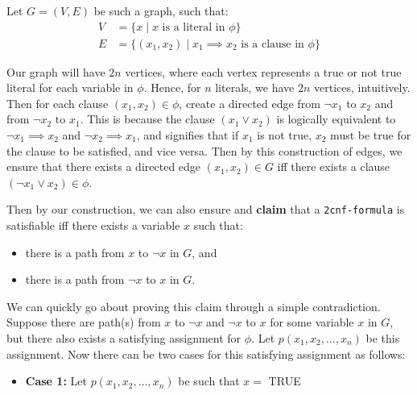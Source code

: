 \documentclass[addpoints,a4paper]{exam}
\begin{document}
\begin{questions}
\begin{solution}
    Let $ G = (V, E) $ be such a graph, such that: \vspace*{-2mm} \begin{align*}
      V & = \{ x \mid x \text{ is a literal in } \phi \}                        \\
      E & = \{ (x_1, x_2) \mid x_1 \implies x_2 \text{ is a clause in } \phi \}
    \end{align*} \vspace*{-7mm}

    Our graph will have $ 2n $ vertices, where each vertex represents a true or not true literal for each variable in $\phi$. Hence, for $n$ literals, we have $2n$ vertices, intuitively. Then for each clause $ (x_1, x_2) \in \phi$, create a directed edge from $ \neg x_1 \text{ to } x_2$ and from $ \neg x_2 \text{ to } x_1 $. This is because the clause $ (x_1 \vee x_2) $ is logically equivalent to $ \neg x_1 \implies x_2 $ and $ \neg x_2 \implies x_1 $, and signifies that if $x_1$ is not true, $x_2$ must be true for the clause to be satisfied, and vice versa. Then by this construction of edges, we ensure that there exists a directed edge $ (x_1, x_2) \in G$ iff there exists a clause $ (\neg x_1 \vee x_2) \in \phi $.

    Then by our construction, we can also ensure and \textbf{claim} that a \texttt{2cnf-formula} is satisfiable iff there exists a variable $x$ such that: \vspace*{-3mm} \begin{itemize}
      \item there is a path from $x$ to $ \neg x $ in $G$, and \vspace*{-2mm} 
      \item there is a path from $ \neg x$ to $x$ in $G$.
    \end{itemize}

    We can quickly go about proving this claim through a simple contradiction. Suppose there are path(s) from $ x $ to $ \neg x $ and $ \neg x $ to $x$ for some variable $x$ in $G$, but there also exists a satisfying assignment for $ \phi $. Let $ p(x_1, x_2, ... , x_n) $ be this assignment. Now there can be two cases for this satisfying assignment as follows:
    \begin{itemize}
      \item[] \textbf{Case 1:} Let $ p(x_1, x_2, ..., x_n) $ be such that $ x = $ TRUE
      

\end{itemize}
\end{solution}
\end{questions}
\end{document}
